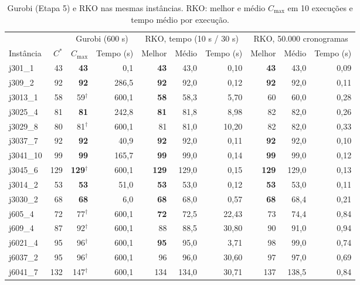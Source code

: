 \documentclass[11pt,a4paper]{article}
\newcommand{\cmax}{C_{\max}}
\begin{document}
\begin{table}[ht]
\centering
\small
\setlength{\tabcolsep}{4.3pt}
\caption{Gurobi (Etapa 5) e RKO nas mesmas instâncias. RKO: melhor e médio $\cmax$ em 10 execuções e tempo médio por execução.}
\label{tab:exato-rko}
\begin{tabular}{lrrrrrrrrr}
\toprule
 & & \multicolumn{2}{c}{Gurobi (600 s)} & \multicolumn{3}{c}{RKO, tempo (10 s / 30 s)} & \multicolumn{3}{c}{RKO, 50.000 cronogramas} \\
\cmidrule(lr){3-4}\cmidrule(lr){5-7}\cmidrule(lr){8-10}
Instância & $C^*$ & $\cmax$ & Tempo (s) & Melhor & Médio & Tempo (s) & Melhor & Médio & Tempo (s) \\
\midrule
j301\_1 & 43 & \textbf{43} & 0,1 & \textbf{43} & 43,0 & 0,10 & \textbf{43} & 43,0 & 0,09 \\
j309\_2 & 92 & \textbf{92} & 286,5 & \textbf{92} & 92,0 & 0,12 & \textbf{92} & 92,0 & 0,11 \\
j3013\_1 & 58 & 59$^\dagger$ & 600,1 & \textbf{58} & 58,3 & 5,70 & 60 & 60,0 & 0,28 \\
j3025\_4 & 81 & \textbf{81} & 242,8 & \textbf{81} & 81,8 & 8,98 & 82 & 82,0 & 0,26 \\
j3029\_8 & 80 & 81$^\dagger$ & 600,1 & 81 & 81,0 & 10,20 & 82 & 82,0 & 0,33 \\
j3037\_7 & 92 & \textbf{92} & 40,9 & \textbf{92} & 92,0 & 0,11 & \textbf{92} & 92,0 & 0,10 \\
j3041\_10 & 99 & \textbf{99} & 165,7 & \textbf{99} & 99,0 & 0,14 & \textbf{99} & 99,0 & 0,12 \\
j3045\_6 & 129 & \textbf{129}$^\dagger$ & 600,1 & \textbf{129} & 129,0 & 0,15 & \textbf{129} & 129,0 & 0,13 \\
j3014\_2 & 53 & \textbf{53} & 51,0 & \textbf{53} & 53,0 & 0,12 & \textbf{53} & 53,0 & 0,11 \\
j3030\_2 & 68 & \textbf{68} & 6,0 & \textbf{68} & 68,0 & 0,57 & \textbf{68} & 68,4 & 0,21 \\
\midrule
j605\_4 & 72 & 77$^\dagger$ & 600,1 & \textbf{72} & 72,5 & 22,43 & 73 & 74,4 & 0,84 \\
j609\_4 & 87 & 92$^\dagger$ & 600,1 & 88 & 88,5 & 30,80 & 90 & 91,0 & 0,94 \\
j6021\_4 & 95 & 96$^\dagger$ & 600,1 & \textbf{95} & 95,0 & 3,71 & 98 & 99,0 & 0,74 \\
j6037\_2 & 95 & 96$^\dagger$ & 600,1 & 96 & 96,0 & 30,60 & 97 & 97,0 & 0,69 \\
j6041\_7 & 132 & 147$^\dagger$ & 600,1 & 134 & 134,0 & 30,71 & 137 & 138,5 & 0,84 \\

\end{tabular}
\end{table}
\end{document}
